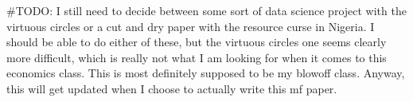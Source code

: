\documentclass[a4paper]{article}
\begin{document}
    #TODO: I still need to decide between some sort of data science project with the virtuous circles or a cut and dry paper with the resource curse in Nigeria. I should be able to do either of these, but the virtuous circles one seems clearly more difficult,
    which is really not what I am looking for when it comes to this economics class. This is most definitely supposed to be my blowoff class. Anyway, this will get updated when I choose to actually write this mf paper.
\end{document}
